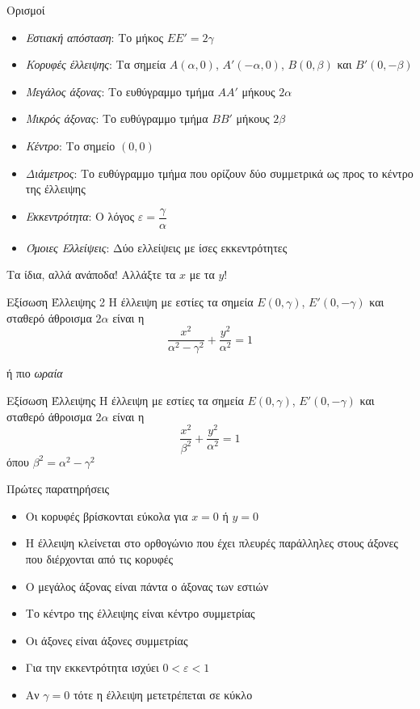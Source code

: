 \documentclass{presentation}
\begin{document}
\begin{frame}{Ορισμοί}
  \begin{itemize}
    \item<1-> \emph{Εστιακή απόσταση}: Το μήκος $ΕΕ'=2γ$
    \item<2-> \emph{Κορυφές έλλειψης}: Τα σημεία $Α(α,0)$, $Α'(-α,0)$, $Β(0,β)$ και $Β'(0,-β)$
    \item<3-> \emph{Μεγάλος άξονας}: Το ευθύγραμμο τμήμα $ΑΑ'$ μήκους $2α$
    \item<4-> \emph{Μικρός άξονας}: Το ευθύγραμμο τμήμα $ΒΒ'$ μήκους $2β$
    \item<5-> \emph{Κέντρο}: Το σημείο $(0,0)$
    \item<6-> \emph{Διάμετρος}: Το ευθύγραμμο τμήμα που ορίζουν δύο συμμετρικά ως προς το κέντρο της έλλειψης
    \item<7-> \emph{Εκκεντρότητα}: Ο λόγος $ε=\dfrac{γ}{α}$
    \item<8-> \emph{Όμοιες Ελλείψεις}: Δύο ελλείψεις με ίσες εκκεντρότητες
  \end{itemize}
\end{frame}

\begin{frame}{Τα ίδια, αλλά ανάποδα!}
  Αλλάξτε τα $x$ με τα $y$!
  \begin{block}{Εξίσωση Έλλειψης 2}
    Η έλλειψη με εστίες τα σημεία $Ε(0,γ)$, $Ε'(0,-γ)$ και σταθερό άθροισμα $2α$ είναι η
    $$\dfrac{x^2}{α^2-γ^2}+\dfrac{y^2}{α^2}=1$$
  \end{block}
  ή πιο \emph{ωραία}
  \begin{block}{Εξίσωση Έλλειψης}
    Η έλλειψη με εστίες τα σημεία $Ε(0,γ)$, $Ε'(0,-γ)$ και σταθερό άθροισμα $2α$ είναι η
    $$\dfrac{x^2}{β^2}+\dfrac{y^2}{α^2}=1$$
    όπου $β^2=α^2-γ^2$
  \end{block}
\end{frame}

\begin{frame}{Πρώτες παρατηρήσεις}
  \begin{itemize}
    \item<1-> Οι κορυφές βρίσκονται εύκολα για $x=0$ ή $y=0$
    \item<2-> Η έλλειψη κλείνεται στο ορθογώνιο που έχει πλευρές παράλληλες στους άξονες που διέρχονται από τις κορυφές
    \item<3-> Ο μεγάλος άξονας είναι πάντα ο άξονας των εστιών
    \item<4-> Το κέντρο της έλλειψης είναι κέντρο συμμετρίας
    \item<5-> Οι άξονες είναι άξονες συμμετρίας
    \item<6-> Για την εκκεντρότητα ισχύει $0<ε<1$
    \item<7-> Αν $γ=0$ τότε η έλλειψη μετετρέπεται σε κύκλο
  \end{itemize}
\end{frame}
\end{document}

